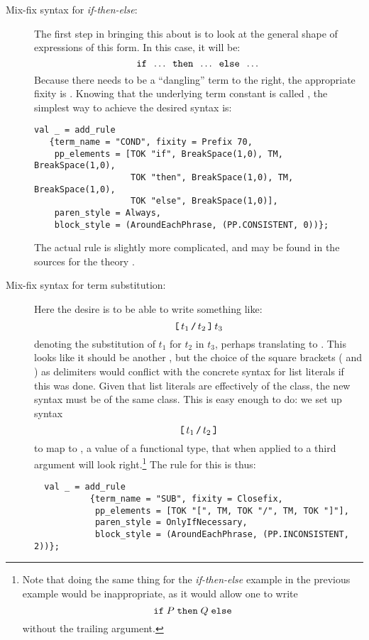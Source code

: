 \begin{description}
\item[Mix-fix syntax for {\it if-then-else}:]
%
The first step in bringing this about is to look at the general shape
of expressions of this form.  In this case, it will be:
%
\[
  \holtxt{if}\;\; \dots \;\;\holtxt{then}\;\;\dots\;\;
  \holtxt{else}\;\;\dots
  \]
%
 Because there needs to be a ``dangling'' term to the right, the
  appropriate fixity is .  Knowing that the underlying
  term constant is called , the simplest way to achieve
  the desired syntax is:
\begin{verbatim}
val _ = add_rule
   {term_name = "COND", fixity = Prefix 70,
    pp_elements = [TOK "if", BreakSpace(1,0), TM, BreakSpace(1,0),
                   TOK "then", BreakSpace(1,0), TM, BreakSpace(1,0),
                   TOK "else", BreakSpace(1,0)],
    paren_style = Always,
    block_style = (AroundEachPhrase, (PP.CONSISTENT, 0))};
\end{verbatim}
\noindent The actual rule is slightly more complicated, and
may be found in the sources for the theory .

\item[Mix-fix syntax for term substitution:]

Here the desire is to be able to write something like:
\[
  \mbox{\texttt{[}}\,t_1\,\mbox{\texttt{/}}\,t_2\,\mbox{\texttt{]}}\,t_3
\]
denoting the substitution of $t_1$ for $t_2$ in $t_3$, perhaps
translating to .  This looks
like it should be another , but the choice of the
square brackets (\holtxt{[} and \holtxt{]}) as delimiters would
conflict with the concrete syntax for list literals if this was done.
Given that list literals are effectively of the 
class, the new syntax must be of the same class.  This is easy enough
to do: we set up syntax
\[
\holtxt{[}\,t_1\,\holtxt{/}\,t_2\,\holtxt{]}
\]
to map to , a value of a functional
type, that when applied to a third argument will look
right.\footnote{Note that doing the same thing for the
  \textit{if-then-else} example in the previous example would be
  inappropriate, as it would allow one to write
\[ \holtxt{if}\;P\;\holtxt{then}\;Q\;\holtxt{else} \]
without the trailing argument.}
The rule for this is thus:
\begin{verbatim}
  val _ = add_rule
           {term_name = "SUB", fixity = Closefix,
            pp_elements = [TOK "[", TM, TOK "/", TM, TOK "]"],
            paren_style = OnlyIfNecessary,
            block_style = (AroundEachPhrase, (PP.INCONSISTENT, 2))};
\end{verbatim}

\end{description}

